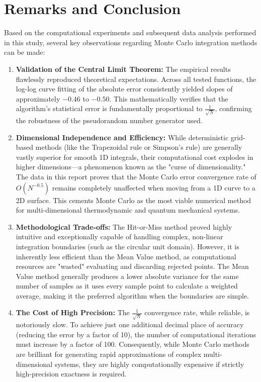 \documentclass[12pt, a4paper, twoside]{article}
\begin{document}
        \section{Remarks and Conclusion}
        Based on the computational experiments and subsequent data analysis performed in this study, several key observations regarding Monte Carlo integration methods can be made:
        \begin{enumerate}
            \item {\bf Validation of the Central Limit Theorem:} The empirical results flawlessly reproduced theoretical expectations. Across all tested functions, the log-log curve fitting of the absolute error consistently yielded slopes of approximately $-0.46$ to $-0.50$. This mathematically verifies that the algorithm's statistical error is fundamentally proportional to $\frac{1}{\sqrt{N}}$, confirming the robustness of the pseudorandom number generator used.
            \item {\bf Dimensional Independence and Efficiency:} While deterministic grid-based methods (like the Trapezoidal rule or Simpson's rule) are generally vastly superior for smooth 1D integrals, their computational cost explodes in higher dimensions—a phenomenon known as the "curse of dimensionality." The data in this report proves that the Monte Carlo error convergence rate of $O(N^{-0.5})$ remains completely unaffected when moving from a 1D curve to a 2D surface. This cements Monte Carlo as the most viable numerical method for multi-dimensional thermodynamic and quantum mechanical systems.
            \item {\bf Methodological Trade-offs:} The Hit-or-Miss method proved highly intuitive and exceptionally capable of handling complex, non-linear integration boundaries (such as the circular unit domain). However, it is inherently less efficient than the Mean Value method, as computational resources are "wasted" evaluating and discarding rejected points. The Mean Value method generally produces a lower absolute variance for the same number of samples as it uses every sample point to calculate a weighted average, making it the preferred algorithm when the boundaries are simple.
            \item {\bf The Cost of High Precision:} The $\frac{1}{\sqrt{N}}$ convergence rate, while reliable, is notoriously slow. To achieve just one additional decimal place of accuracy (reducing the error by a factor of 10), the number of computational iterations must increase by a factor of 100. Consequently, while Monte Carlo methods are brilliant for generating rapid approximations of complex multi-dimensional systems, they are highly computationally expensive if strictly high-precision exactness is required.
        \end{enumerate}
        
\end{document}
